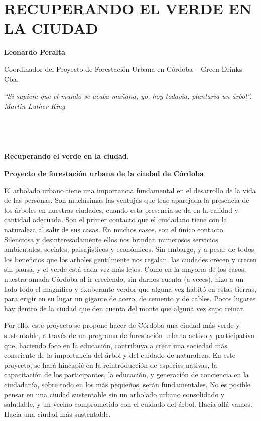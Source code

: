 \chapter{RECUPERANDO EL VERDE EN LA CIUDAD}\label{recuperando-el-verde-en-la-ciudad}


\textbf{Leonardo Peralta}

Coordinador del Proyecto de Forestación Urbana en Córdoba -- Green
Drinks Cba.

\emph{``Si supiera que el mundo se acaba mañana, yo, hoy todavía,
plantaría un árbol''. Martin Luther King}

~

\textbf{\\
}

\textbf{Recuperando el verde en la ciudad.}

\textbf{Proyecto de forestación urbana de la ciudad de Córdoba}

El arbolado urbano tiene una importancia fundamental en el desarrollo de
la vida de las personas. Son muchísimas las ventajas que trae aparejada
la presencia de los árboles en nuestras ciudades, cuando esta presencia
se da en la calidad y cantidad adecuada. Son el primer contacto que el
ciudadano tiene con la naturaleza al salir de sus casas. En muchos
casos, son el único contacto. Silenciosa y desinteresadamente ellos nos
brindan numerosos servicios ambientales, sociales, paisajísticos y
económicos. Sin embargo, y a pesar de todos los beneficios que los
arboles gentilmente nos regalan, las ciudades crecen y crecen sin pausa,
y el verde está cada vez más lejos. Como en la mayoría de los casos,
nuestra amada Córdoba al ir creciendo, sin darnos cuenta (a veces), hizo
a un lado todo el magnífico y exuberante verdor que alguna vez habitó en
estas tierras, para erigir en su lugar un gigante de acero, de cemento y
de cables. Pocos lugares hay dentro de la ciudad que den cuenta del
monte que alguna vez supo reinar.

Por ello, este proyecto se propone hacer de Córdoba una ciudad más verde
y sustentable, a través de un programa de forestación urbana activo y
participativo que, haciendo foco en la educación, contribuya a crear una
sociedad más consciente de la importancia del árbol y del cuidado de
naturaleza. En este proyecto, se hará hincapié en la reintroducción de
especies nativas, la capacitación de los participantes, la educación, y
generación de conciencia en la ciudadanía, sobre todo en los más
pequeños, serán fundamentales. No es posible pensar en una ciudad
sustentable sin un arbolado urbano consolidado y saludable, y un vecino
comprometido con el cuidado del árbol. Hacia allá vamos. Hacia una
ciudad más sustentable.

